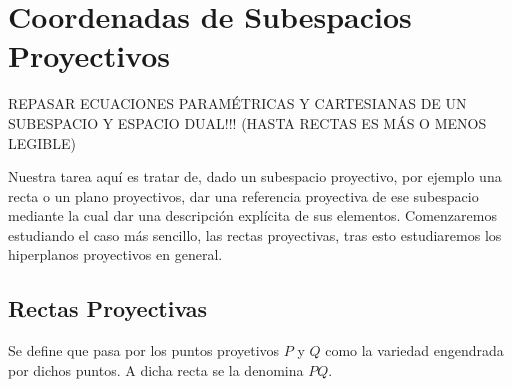 \section{Coordenadas de Subespacios Proyectivos}
REPASAR ECUACIONES PARAMÉTRICAS Y CARTESIANAS DE UN SUBESPACIO Y ESPACIO DUAL!!! (HASTA RECTAS ES MÁS O MENOS LEGIBLE)

Nuestra tarea aquí es tratar de, dado un subespacio proyectivo, por ejemplo una recta o un plano proyectivos, dar una referencia proyectiva de ese subespacio mediante la cual dar una descripción explícita de sus elementos. Comenzaremos estudiando el caso más sencillo, las rectas proyectivas, tras esto estudiaremos los hiperplanos proyectivos en general.
\subsection{Rectas Proyectivas}
\begin{defi}
	\label{C1_def_rectaProyectiva}
	Se define  que pasa por los puntos proyetivos $P$ y $Q$ como la variedad engendrada por dichos puntos. A dicha recta se la denomina  $PQ$.
\end{defi}
